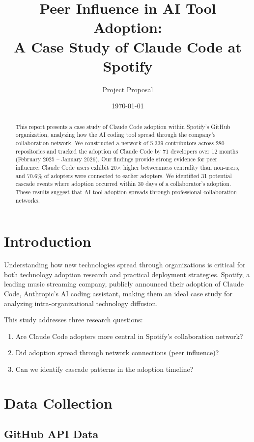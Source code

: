 \documentclass[11pt]{article}
\title{Peer Influence in AI Tool Adoption:\\A Case Study of Claude Code at Spotify}
\author{Project Proposal\\[1em]}
\date{\today}
\begin{document}
\maketitle

\begin{abstract}
This report presents a case study of Claude Code adoption within Spotify's GitHub organization, analyzing how the AI coding tool spread through the company's collaboration network. We constructed a network of 5,339 contributors across 280 repositories and tracked the adoption of Claude Code by 71 developers over 12 months (February 2025 -- January 2026). Our findings provide strong evidence for peer influence: Claude Code users exhibit 20$\times$ higher betweenness centrality than non-users, and 70.6\% of adopters were connected to earlier adopters. We identified 31 potential cascade events where adoption occurred within 30 days of a collaborator's adoption. These results suggest that AI tool adoption spreads through professional collaboration networks.
\end{abstract}

\section{Introduction}

Understanding how new technologies spread through organizations is critical for both technology adoption research and practical deployment strategies. Spotify, a leading music streaming company, publicly announced their adoption of Claude Code, Anthropic's AI coding assistant, making them an ideal case study for analyzing intra-organizational technology diffusion.

This study addresses three research questions:
\begin{enumerate}
    \item Are Claude Code adopters more central in Spotify's collaboration network?
    \item Did adoption spread through network connections (peer influence)?
    \item Can we identify cascade patterns in the adoption timeline?
\end{enumerate}

\section{Data Collection}

\subsection{GitHub API Data}
\end{document}
